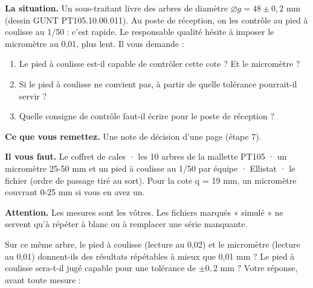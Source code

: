\documentclass[10pt,a4paper]{article}
\begin{document}
\thispagestyle{fancy}

\begin{tcolorbox}[boite]
\textbf{La situation.} Un sous-traitant livre des arbres de diamètre $\varnothing g = 48 \pm 0{,}2$ mm (dessin GUNT PT105.10.00.011). Au poste de réception, on les contrôle au pied à coulisse au 1/50 : c'est rapide. Le responsable qualité hésite à imposer le micromètre au 0,01, plus lent. Il vous demande :
\begin{enumerate}[label=\textcolor{cyan}{\textbf{\arabic*.}},leftmargin=15pt]
\item Le pied à coulisse est-il capable de contrôler cette cote ? Et le micromètre ?
\item Si le pied à coulisse ne convient pas, à partir de quelle tolérance pourrait-il servir ?
\item Quelle consigne de contrôle faut-il écrire pour le poste de réception ?
\end{enumerate}
\textbf{Ce que vous remettez.} Une note de décision d'une page (étape 7).\par
\textbf{Il vous faut.} Le coffret de cales · les 10 arbres de la mallette PT105 · un micromètre 25-50 mm et un pied à coulisse au 1/50 par équipe · Ellistat · le fichier  (ordre de passage tiré au sort). Pour la cote q = 19 mm, un micromètre couvrant 0-25 mm si vous en avez un.\par
\textbf{Attention.} Les mesures sont les vôtres. Les fichiers marqués « simulé » ne servent qu'à répéter à blanc ou à remplacer une série manquante.
\end{tcolorbox}

\begin{tcolorbox}[pred]
Sur ce même arbre, le pied à coulisse (lecture au 0,02) et le micromètre (lecture au 0,01) donnent-ils des résultats répétables à mieux que 0,01 mm ? Le pied à coulisse sera-t-il jugé capable pour une tolérance de $\pm 0{,}2$ mm ? Votre réponse, avant toute mesure :\reponse[2]
\end{tcolorbox}

\end{document}
